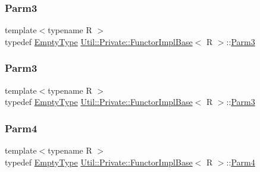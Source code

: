 \mbox{\label{structUtil_1_1Private_1_1FunctorImplBase_a052148e627fd4caecbcffdbdf1033dbb}} 
\subsubsection{\texorpdfstring{Parm3}{Parm3}\hspace{0.1cm}{\footnotesize\ttfamily [1/2]}}
{\footnotesize\ttfamily template$<$typename R $>$ \\
typedef \mbox{\hyperlink{classUtil_1_1EmptyType}{Empty\+Type}} \mbox{\hyperlink{structUtil_1_1Private_1_1FunctorImplBase}{Util\+::\+Private\+::\+Functor\+Impl\+Base}}$<$ R $>$\+::\mbox{\hyperlink{structUtil_1_1Private_1_1FunctorImplBase_a052148e627fd4caecbcffdbdf1033dbb}{Parm3}}}

\mbox{\label{structUtil_1_1Private_1_1FunctorImplBase_a052148e627fd4caecbcffdbdf1033dbb}} 
\subsubsection{\texorpdfstring{Parm3}{Parm3}\hspace{0.1cm}{\footnotesize\ttfamily [2/2]}}
{\footnotesize\ttfamily template$<$typename R $>$ \\
typedef \mbox{\hyperlink{classUtil_1_1EmptyType}{Empty\+Type}} \mbox{\hyperlink{structUtil_1_1Private_1_1FunctorImplBase}{Util\+::\+Private\+::\+Functor\+Impl\+Base}}$<$ R $>$\+::\mbox{\hyperlink{structUtil_1_1Private_1_1FunctorImplBase_a052148e627fd4caecbcffdbdf1033dbb}{Parm3}}}

\mbox{\label{structUtil_1_1Private_1_1FunctorImplBase_a1ad7fe3f243480c44a610927ebe76762}} 
\subsubsection{\texorpdfstring{Parm4}{Parm4}\hspace{0.1cm}{\footnotesize\ttfamily [1/2]}}
{\footnotesize\ttfamily template$<$typename R $>$ \\
typedef \mbox{\hyperlink{classUtil_1_1EmptyType}{Empty\+Type}} \mbox{\hyperlink{structUtil_1_1Private_1_1FunctorImplBase}{Util\+::\+Private\+::\+Functor\+Impl\+Base}}$<$ R $>$\+::\mbox{\hyperlink{structUtil_1_1Private_1_1FunctorImplBase_a1ad7fe3f243480c44a610927ebe76762}{Parm4}}}

